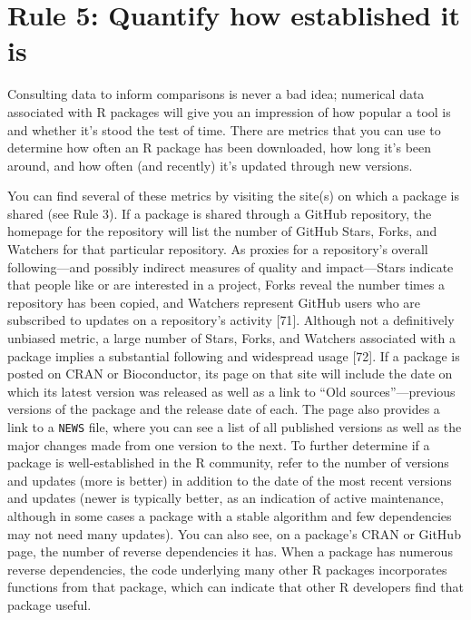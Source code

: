 \documentclass[10pt,letterpaper]{article}
\begin{document}
\hypertarget{rule-5-quantify-how-established-it-is}{%
\section{Rule 5: Quantify how established it
is}\label{rule-5-quantify-how-established-it-is}}

Consulting data to inform comparisons is never a bad idea; numerical
data associated with R packages will give you an impression of how
popular a tool is and whether it's stood the test of time. There are
metrics that you can use to determine how often an R package has been
downloaded, how long it's been around, and how often (and recently) it's
updated through new versions.

You can find several of these metrics by visiting the site(s) on which a
package is shared (see Rule 3). If a package is shared through a GitHub
repository, the homepage for the repository will list the number of
GitHub Stars, Forks, and Watchers for that particular repository. As
proxies for a repository's overall following---and possibly indirect
measures of quality and impact---Stars indicate that people like or are
interested in a project, Forks reveal the number times a repository has
been copied, and Watchers represent GitHub users who are subscribed to
updates on a repository's activity {[}71{]}. Although not a definitively
unbiased metric, a large number of Stars, Forks, and Watchers associated
with a package implies a substantial following and widespread usage
{[}72{]}. If a package is posted on CRAN or Bioconductor, its page on
that site will include the date on which its latest version was released
as well as a link to ``Old sources''---previous versions of the package
and the release date of each. The page also provides a link to a
\texttt{NEWS} file, where you can see a list of all published versions
as well as the major changes made from one version to the next. To
further determine if a package is well-established in the R community,
refer to the number of versions and updates (more is better) in addition
to the date of the most recent versions and updates (newer is typically
better, as an indication of active maintenance, although in some cases a
package with a stable algorithm and few dependencies may not need many
updates). You can also see, on a package's CRAN or GitHub page, the
number of reverse dependencies it has. When a package has numerous
reverse dependencies, the code underlying many other R packages
incorporates functions from that package, which can indicate that other
R developers find that package useful.
\end{document}
